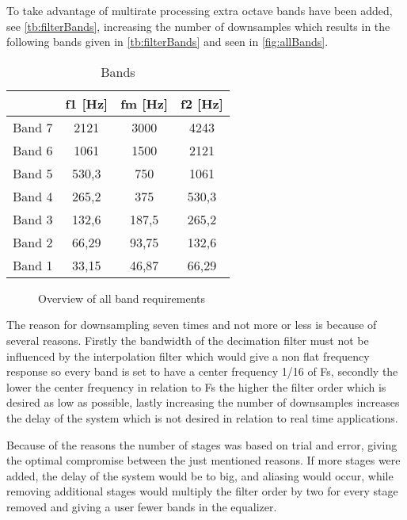 To take advantage of multirate processing extra octave bands have been added, see \autoref{tb:filterBands}, increasing the number of downsamples which results in the following bands given in \autoref{tb:filterBands} and seen in \autoref{fig:allBands}.
\begin{table}[H]
\centering
\begin{tabular}{|c|c|c|c|}
\hline
       & f1 {[}Hz{]} & fm {[}Hz{]} & f2 {[}Hz{]} \\ \hline
Band 7 & 2121        & 3000        & 4243        \\ \hline
Band 6 & 1061        & 1500        & 2121        \\ \hline
Band 5 & 530,3       & 750         & 1061        \\ \hline
Band 4 & 265,2       & 375         & 530,3       \\ \hline
Band 3 & 132,6       & 187,5       & 265,2       \\ \hline
Band 2 & 66,29       & 93,75       & 132,6       \\ \hline
Band 1 & 33,15       & 46,87       & 66,29       \\ \hline
\end{tabular}
\caption{Bands}
\label{tb:filterBands}
\end{table}   

\begin{figure}[H]
	\centering
	
	\caption{Overview of all band requirements}
	\label{fig:allBands}
\end{figure}
The reason for downsampling seven times and not more or less is because of several reasons. Firstly the bandwidth of the decimation filter must not be influenced by the interpolation filter which would give a non flat frequency response so every band is set to have a center frequency 1/16 of Fs, secondly the lower the center frequency in relation to Fs the higher the filter order which is desired as low as possible, lastly increasing the number of downsamples increases the delay of the system which is not desired in relation to real time applications.      

Because of the reasons the number of stages was based on trial and error, giving the optimal compromise between the just mentioned reasons. If more stages were added, the delay of the system would be to big, and aliasing would occur, while removing additional stages would multiply the filter order by two for every stage removed and giving a user fewer bands in the equalizer.    

